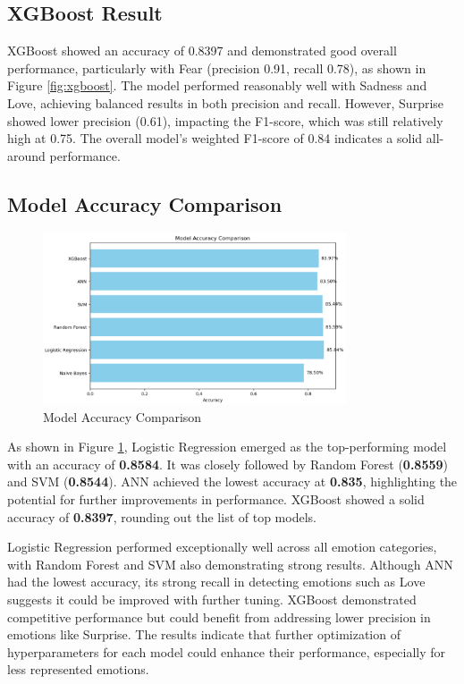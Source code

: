 \subsection{XGBoost Result}
XGBoost showed an accuracy of 0.8397 and demonstrated good overall performance, particularly with Fear (precision 0.91, recall 0.78), as shown in Figure \ref{fig:xgboost}. The model performed reasonably well with Sadness and Love, achieving balanced results in both precision and recall. However, Surprise showed lower precision (0.61), impacting the F1-score, which was still relatively high at 0.75. The overall model's weighted F1-score of 0.84 indicates a solid all-around performance.

\subsection{Model Accuracy Comparison}
\begin{figure}[h!]
\centering
\includegraphics[width=0.8\textwidth]{images/model_accuracy.png}
\caption{Model Accuracy Comparison}
\label{fig:model_accuracy}
\end{figure}

As shown in Figure \ref{fig:model_accuracy}, Logistic Regression emerged as the top-performing model with an accuracy of \textbf{0.8584}. It was closely followed by Random Forest (\textbf{0.8559}) and SVM (\textbf{0.8544}). ANN achieved the lowest accuracy at \textbf{0.835}, highlighting the potential for further improvements in performance. XGBoost showed a solid accuracy of \textbf{0.8397}, rounding out the list of top models.

Logistic Regression performed exceptionally well across all emotion categories, with Random Forest and SVM also demonstrating strong results. Although ANN had the lowest accuracy, its strong recall in detecting emotions such as Love suggests it could be improved with further tuning. XGBoost demonstrated competitive performance but could benefit from addressing lower precision in emotions like Surprise. The results indicate that further optimization of hyperparameters for each model could enhance their performance, especially for less represented emotions.


